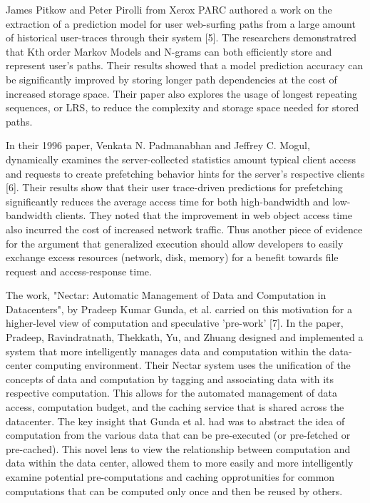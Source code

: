 James Pitkow and Peter Pirolli from Xerox PARC authored a work  on the extraction of a prediction model for user web-surfing paths from a large amount of historical user-traces through their system [5]. The researchers demonstratred that Kth order Markov Models and N-grams can both efficiently store and represent user's paths. Their results showed that a model prediction accuracy can be significantly improved by storing longer path dependencies at the cost of increased storage space. Their paper also explores the usage of longest repeating sequences, or LRS, to reduce the complexity and storage space needed for stored paths.

In their 1996 paper, Venkata N. Padmanabhan and Jeffrey C. Mogul, dynamically examines the server-collected statistics amount typical client access and requests to create prefetching behavior hints for the server's respective clients [6]. Their results show that their user trace-driven predictions for prefetching significantly reduces the average access time for both high-bandwidth and low-bandwidth clients. They noted that the improvement in web object access time also incurred the cost of increased network traffic. Thus another piece of evidence for the argument that generalized execution should allow developers to easily exchange excess resources (network, disk, memory) for a benefit towards file request and access-response time.

The work, "Nectar: Automatic Management of Data and Computation in Datacenters", by Pradeep Kumar Gunda, et al. carried on this motivation for a higher-level view of computation and speculative 'pre-work' [7]. In the paper, Pradeep, Ravindratnath, Thekkath, Yu, and Zhuang designed and implemented a system that more intelligently manages data and computation within the data-center computing environment. Their Nectar system uses the unification of the concepts of data and computation by tagging and associating data with its respective computation. This allows for the automated management of data access, computation budget, and the caching service that is shared across the datacenter.  The key insight that Gunda et al. had was to abstract the idea of computation from the various data that can be pre-executed (or pre-fetched or pre-cached). This novel lens to view the relationship between computation and data within the data center, allowed them to more easily and more intelligently examine potential pre-computations and caching opprotunities for common computations that can be computed only once and then be reused by others.

